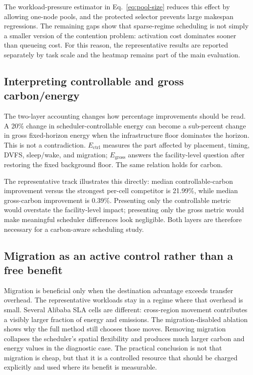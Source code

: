 The workload-pressure estimator in Eq.~\eqref{eq:pool-size} reduces this effect by allowing one-node pools, and the protected selector prevents large makespan regressions. The remaining gaps show that sparse-regime scheduling is not simply a smaller version of the contention problem: activation cost dominates sooner than queueing cost. For this reason, the representative results are reported separately by task scale and the heatmap remains part of the main evaluation.

\subsection{Interpreting controllable and gross carbon/energy}

The two-layer accounting changes how percentage improvements should be read. A 20\% change in scheduler-controllable energy can become a sub-percent change in gross fixed-horizon energy when the infrastructure floor dominates the horizon. This is not a contradiction. $E_{\mathrm{ctrl}}$ measures the part affected by placement, timing, DVFS, sleep/wake, and migration; $E_{\mathrm{gross}}$ answers the facility-level question after restoring the fixed background floor. The same relation holds for carbon.

The representative track illustrates this directly: median controllable-carbon improvement versus the strongest per-cell competitor is 21.99\%, while median gross-carbon improvement is 0.39\%. Presenting only the controllable metric would overstate the facility-level impact; presenting only the gross metric would make meaningful scheduler differences look negligible. Both layers are therefore necessary for a carbon-aware scheduling study.

\subsection{Migration as an active control rather than a free benefit}

Migration is beneficial only when the destination advantage exceeds transfer overhead. The representative workloads stay in a regime where that overhead is small. Several Alibaba SLA cells are different: cross-region movement contributes a visibly larger fraction of energy and emissions. The migration-disabled ablation shows why the full method still chooses those moves. Removing migration collapses the scheduler's spatial flexibility and produces much larger carbon and energy values in the diagnostic case. The practical conclusion is not that migration is cheap, but that it is a controlled resource that should be charged explicitly and used where its benefit is measurable.

